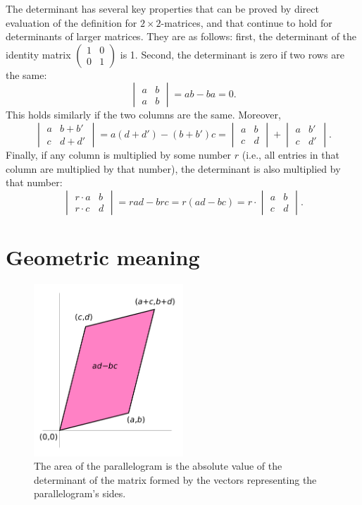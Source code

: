 The determinant has several key properties that can be proved by direct
evaluation of the definition for $2 \times 2$-matrices, and that
continue to hold for determinants of larger matrices. They are as
follows: first, the determinant of the identity matrix
$\begin{pmatrix}1 & 0 \\ 0 & 1 \end{pmatrix}$ is 1. Second, the
determinant is zero if two rows are the same:
$$\begin{vmatrix} a & b \\ a & b \end{vmatrix} = ab - ba = 0.$$
This holds similarly if the two columns are the same. Moreover,
$$\begin{vmatrix} a & b + b' \\ c & d + d' \end{vmatrix} = a(d+d')-(b+b')c = \begin{vmatrix}a & b\\ c & d \end{vmatrix} + \begin{vmatrix}a & b' \\ c & d' \end{vmatrix}.$$
Finally, if any column is multiplied by some number $r$ (i.e., all
entries in that column are multiplied by that number), the determinant
is also multiplied by that number:
$$\begin{vmatrix} r \cdot a & b \\ r \cdot c & d \end{vmatrix} = rad - brc = r(ad-bc) = r \cdot \begin{vmatrix} a & b \\c & d \end{vmatrix}.$$

\section{Geometric meaning}

\begin{figure}
\centering
\includegraphics[width=0.5\textwidth]{Area_parallellogram_as_determinant.png}
\caption{\label{fig:geo} The area of the parallelogram is the absolute
  value of the determinant of the matrix formed by the vectors
  representing the parallelogram's sides.}
\end{figure}

